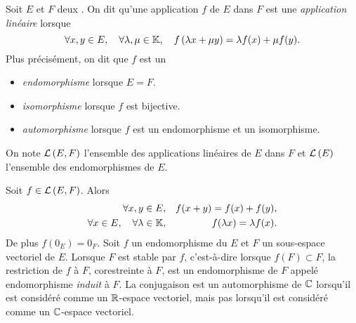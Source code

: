 \documentclass{magnolia}
\begin{document}
\begin{definition}[utile=-3]
Soit $E$ et $F$ deux \Kevs. On dit qu'une application $f$ de $E$ dans $F$ est
une \emph{application linéaire} lorsque
\[\forall x,y\in E ,\quad \forall \lambda,\mu\in\mathbb{K} ,\quad
  f\left(\lambda x+\mu y\right)=\lambda f(x)+\mu f(y).\]
Plus précisément, on dit que $f$ est un
\begin{itemize}
\item \emph{endomorphisme} lorsque $E=F$.
\item \emph{isomorphisme} lorsque $f$ est bijective.
\item \emph{automorphisme} lorsque $f$ est un endomorphisme et un isomorphisme.
\end{itemize}
On note $\mathcal{L}\left(E,F\right)$ l'ensemble des applications linéaires de $E$ dans $F$ et
$\mathcal{L}\left(E\right)$ l'ensemble des endomorphismes de $E$.
\end{definition}

\begin{remarques}
\remarque Soit $f\in\mathcal{L}\left(E,F\right)$. Alors
\begin{eqnarray*}
\forall x,y\in E,& & f(x+y)=f(x)+f(y),\\
\forall x\in E,\quad \forall \lambda\in\mathbb{K},& & f(\lambda x)=\lambda f(x).
\end{eqnarray*}
De plus $f(0_E)=0_F$.
\remarque Soit $f$ un endomorphisme du \Kev $E$ et $F$ un sous-espace
  vectoriel de $E$. Lorsque $F$ est stable par $f$, c'est-à-dire
  lorsque $f(F)\subset F$, la restriction de $f$ à $F$, corestreinte à $F$, est
  un endomorphisme de $F$ appelé endomorphisme \emph{induit} à $F$.
\remarque La conjugaison est un automorphisme de $\mathbb{C}$ lorsqu'il est considéré
  comme un $\mathbb{R}$-espace vectoriel, mais pas lorsqu'il est considéré comme un
  $\mathbb{C}$-espace vectoriel.
\end{remarques}
\end{document}
